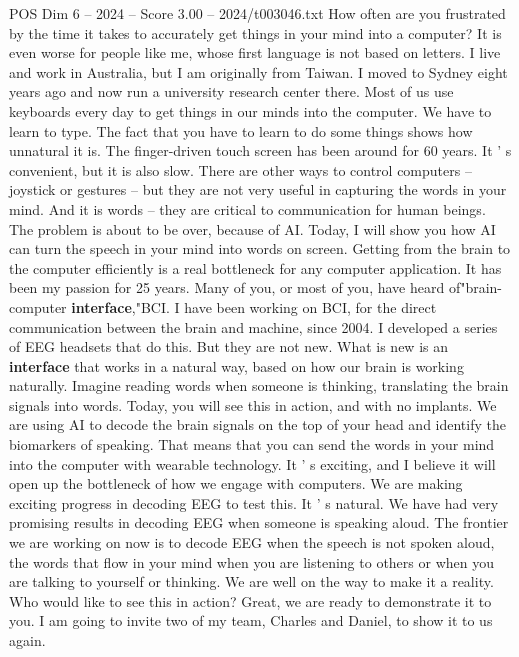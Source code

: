 \begin{textsample}{POS Dim 6 – 2024 – Score 3.00 – 2024/t003046.txt}  \label{ex:f6_pos_075}
How often are you frustrated by the time it takes to accurately get things in your mind into a computer?
It is even worse for people like me, whose first language is not based on letters.
I live and work in Australia, but I am originally from Taiwan.
I moved to Sydney eight years ago and now run a university research center there.
Most of us use keyboards every day to get things in our minds into the computer.
We have to learn to type.
The fact that you have to learn to do some things shows how unnatural it is.
The finger-driven touch screen has been around for 60 years.
It ' s convenient, but it is also slow.
There are other ways to control computers -- joystick or gestures -- but they are not very useful in capturing the words in your mind.
And it is words -- they are critical to communication for human beings.
The problem is about to be over, because of AI.
Today, I will show you how AI can turn the speech in your mind into words on screen.
Getting from the brain to the computer efficiently is a real bottleneck for any computer application.
It has been my passion for 25 years.
Many of you, or most of you, have heard of"brain-computer \textbf{interface},"BCI.
I have been working on BCI, for the direct communication between the brain and machine, since 2004.
I developed a series of EEG headsets that do this.
But they are not new.
What is new is an \textbf{interface} that works in a natural way, based on how our brain is working naturally.
Imagine reading words when someone is thinking, translating the brain signals into words.
Today, you will see this in action, and with no implants.
We are using AI to decode the brain signals on the top of your head and identify the biomarkers of speaking.
That means that you can send the words in your mind into the computer with wearable technology.
It ' s exciting, and I believe it will open up the bottleneck of how we engage with computers.
We are making exciting progress in decoding EEG to test this.
It ' s natural.
We have had very promising results in decoding EEG when someone is speaking aloud.
The frontier we are working on now is to decode EEG when the speech is not spoken aloud, the words that flow in your mind when you are listening to others or when you are talking to yourself or thinking.
We are well on the way to make it a reality.
Who would like to see this in action?
Great, we are ready to demonstrate it to you.
I am going to invite two of my team, Charles and Daniel, to show it to us again.

\end{textsample}
